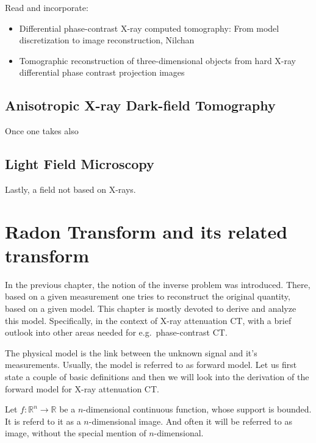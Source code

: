 Read and incorporate:
\begin{itemize}
	\item Differential phase-contrast X-ray computed tomography: From model discretization to image
	      reconstruction, Nilchan
	\item Tomographic reconstruction of three-dimensional objects from hard X-ray differential phase
	      contrast projection images
\end{itemize}


\section{Anisotropic X-ray Dark-field Tomography}\label{sec:axdt}

Once one takes also

\section{Light Field Microscopy}\label{sec:lightfield_microscopy}

Lastly, a field not based on X-rays.


\chapter{Radon Transform and its related transform}\label{chap:radon_transform_and_related}

In the previous chapter, the notion of the inverse problem was introduced. There, based on a given
measurement one tries to reconstruct the original quantity, based on a given model. This chapter is
mostly devoted to derive and analyze this model. Specifically, in the context of X-ray attenuation
CT, with a brief outlook into other areas needed for e.g.\ phase-contrast CT\@.

The physical model is the link between the unknown signal and it's measurements. Usually, the model
is referred to as forward model. Let us first state a couple of basic definitions and then we will
look into the derivation of the forward model for X-ray attenuation CT\@.

\begin{definition}[Image]\label{def:image}
	Let \(f\colon \mathbb{R}^n \to \mathbb{R}\) be a \(n\)-dimensional continuous function,
	whose support is bounded. It is referd to it as a \(n\)-dimensional image. And often it will
	be referred to as image, without the special mention of \(n\)-dimensional.
\end{definition}

